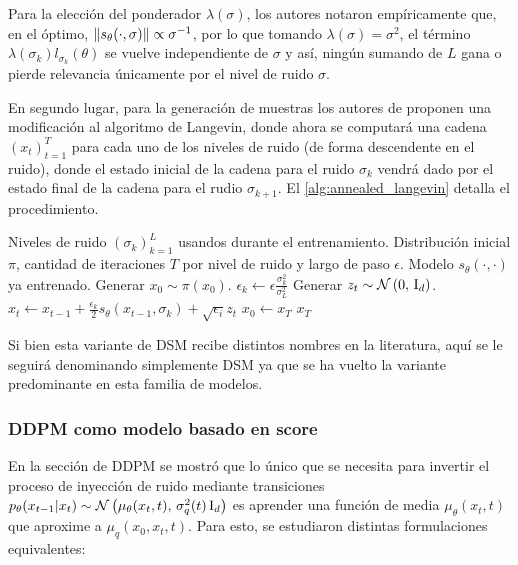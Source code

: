 Para la elección del ponderador $\lambda(\sigma)$, los autores notaron empíricamente que, en el óptimo, $\left\lVert s_\theta(\cdot, \sigma) \right\rVert\propto \sigma^{-1}$, por lo que tomando $\lambda(\sigma) = \sigma^2$, el término $\lambda(\sigma_k) l_{\sigma_k}(\theta)$ se vuelve independiente de $\sigma$ y así, ningún sumando de $L$ gana o pierde relevancia únicamente por el nivel de ruido $\sigma$.

En segundo lugar, para la generación de muestras los autores de \cite{song2020generative} proponen una modificación al algoritmo de Langevin, donde ahora se computará una cadena $(x_t)_{t=1}^T$ para cada uno de los niveles de ruido (de forma descendente en el ruido), donde el estado inicial de la cadena para el ruido $\sigma_k$ vendrá dado por el estado final de la cadena para el rudio $\sigma_{k+1}$. El \autoref{alg:annealed_langevin} detalla el procedimiento.

\begin{algorithm}
    \caption{Annealed Langevin sampling}
    \label{alg:annealed_langevin}
    \begin{algorithmic}[1]
        \Require Niveles de ruido $(\sigma_k)_{k=1}^L$ usandos durante el entrenamiento.
        \Require Distribución inicial $\pi$, cantidad de iteraciones $T$ por nivel de ruido y largo de paso $\epsilon$.
        \Require Modelo $s_\theta(\cdot,\cdot)$ ya entrenado.
        \State Generar $x_0\sim \pi(x_0)$.
        \State $\epsilon_k \gets \epsilon \frac{\sigma_k^2}{\sigma_L^2}$  
        \State Generar $z_t\sim \mathcal{N}\left(0,\,\operatorname{I}_{d}\right)$.
        \State $x_t\gets x_{t-1} + \frac{\epsilon_k}{2}s_\theta(x_{t-1},\sigma_k) + \sqrt{\epsilon_i} z_t$
        \EndFor
        \State $x_0\gets x_T$
        \EndFor
        \State\Return $x_T$
    \end{algorithmic}
\end{algorithm}

Si bien esta variante de DSM recibe distintos nombres en la literatura, aquí se le seguirá denominando simplemente DSM ya que se ha vuelto la variante predominante en esta familia de modelos.

\subsubsection{DDPM como modelo basado en score}

En la sección de DDPM se mostró que lo único que se necesita para invertir el proceso de inyección de ruido mediante transiciones $p_\theta(x_{t-1}|x_t)\sim\mathcal{N}\left(\mu_\theta(x_t,t),\,\sigma_q^2(t)\operatorname{I}_{d}\right)$ es aprender una función de media $\mu_\theta(x_t,t)$ que aproxime a $\mu_q(x_0,x_t,t)$. Para esto, se estudiaron distintas formulaciones equivalentes:

